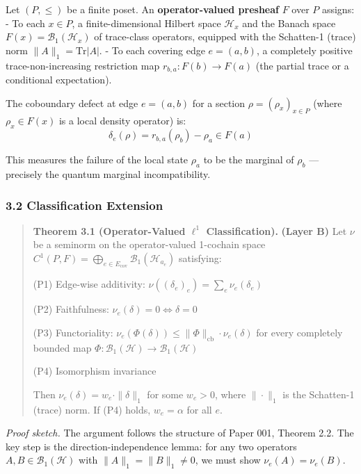 \documentclass[
]{article}
\begin{document}
Let \((P, \leq)\) be a finite poset. An \textbf{operator-valued
presheaf} \(F\) over \(P\) assigns: - To each \(x \in P\), a
finite-dimensional Hilbert space \(\mathcal{H}_x\) and the Banach space
\(F(x) = \mathcal{B}_1(\mathcal{H}_x)\) of trace-class operators,
equipped with the Schatten-1 (trace) norm \(\|A\|_1 = \mathrm{Tr}|A|\).
- To each covering edge \(e = (a, b)\), a completely positive
trace-non-increasing restriction map \(r_{b,a}: F(b) \to F(a)\) (the
partial trace or a conditional expectation).

The coboundary defect at edge \(e = (a, b)\) for a section
\(\rho = (\rho_x)_{x \in P}\) (where \(\rho_x \in F(x)\) is a local
density operator) is:
\[\delta_e(\rho) = r_{b,a}(\rho_b) - \rho_a \in F(a)\]

This measures the failure of the local state \(\rho_a\) to be the
marginal of \(\rho_b\) --- precisely the quantum marginal
incompatibility.

\subsubsection{3.2 Classification
Extension}\label{classification-extension}

\begin{quote}
\textbf{Theorem 3.1 (Operator-Valued \(\ell^1\) Classification).}
\textbf{(Layer B)} Let \(\nu\) be a seminorm on the operator-valued
1-cochain space
\(C^1(P, F) = \bigoplus_{e \in E_{\mathrm{cov}}} \mathcal{B}_1(\mathcal{H}_{a_e})\)
satisfying:

(P1) Edge-wise additivity:
\(\nu((\delta_e)_e) = \sum_e \nu_e(\delta_e)\)

(P2) Faithfulness: \(\nu_e(\delta) = 0 \iff \delta = 0\)

(P3) Functoriality:
\(\nu_e(\Phi(\delta)) \leq \|\Phi\|_{\mathrm{cb}} \cdot \nu_e(\delta)\)
for every completely bounded map
\(\Phi: \mathcal{B}_1(\mathcal{H}) \to \mathcal{B}_1(\mathcal{H})\)

(P4) Isomorphism invariance

Then \(\nu_e(\delta) = w_e \cdot \|\delta\|_1\) for some \(w_e > 0\),
where \(\|\cdot\|_1\) is the Schatten-1 (trace) norm. If (P4) holds,
\(w_e = \alpha\) for all \(e\).
\end{quote}

\emph{Proof sketch.} The argument follows the structure of Paper 001,
Theorem 2.2. The key step is the direction-independence lemma: for any
two operators \(A, B \in \mathcal{B}_1(\mathcal{H})\) with
\(\|A\|_1 = \|B\|_1 \neq 0\), we must show \(\nu_e(A) = \nu_e(B)\).
\end{document}
